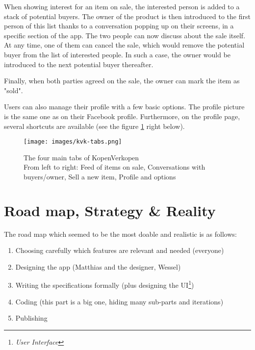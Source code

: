 \medskip

When showing interest for an item on sale, the interested person is added to a stack of potential buyers. The owner of the product is then introduced to the first person of this list thanks to a conversation popping up on their screens, in a specific section of the app. The two people can now discuss about the sale itself. At any time, one of them can cancel the sale, which would remove the potential buyer from the list of interested people. In such a case, the owner would be introduced to the next potential buyer thereafter.

Finally, when both parties agreed on the sale, the owner can mark the item as "sold".

\medskip

Users can also manage their profile with a few basic options. The profile picture is the same one as on their Facebook profile. Furthermore, on the profile page, several shortcuts are available (see the figure \ref{tabs-kvk} right below).

\begin{figure}[H]
   \centering\texttt{[image: images/kvk-tabs.png]}
   \caption[The four main tabs of KopenVerkopen]{The four main tabs of KopenVerkopen\\From left to right: Feed of items on sale, Conversations with buyers/owner, Sell a new item, Profile and options}\label{tabs-kvk}
\end{figure}

\section{Road map, Strategy \& Reality}

The road map which seemed to be the most doable and realistic is as follows:

\begin{enumerate}
  \item Choosing carefully which features are relevant and needed (everyone)
  \item Designing the app (Matthias and the designer, Wessel)
  \item Writing the specifications formally (plus designing the UI\footnote{\textit{User Interface}})
  \item Coding (this part is a big one, hiding many sub-parts and iterations)
  \item Publishing
\end{enumerate}

